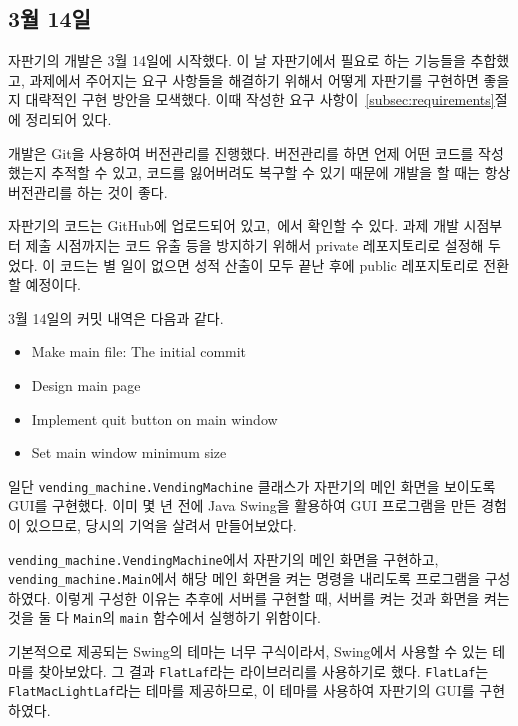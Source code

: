 \documentclass{oblivoir}
\begin{document}
    \subsection{3월 14일}\label{subsec:3-14}

    자판기의 개발은 3월 14일에 시작했다.
    이 날 자판기에서 필요로 하는 기능들을 추합했고,
    과제에서 주어지는 요구 사항들을 해결하기 위해서 어떻게 자판기를 구현하면 좋을지 대략적인 구현 방안을 모색했다.
    이때 작성한 요구 사항이~\ref{subsec:requirements}절에 정리되어 있다.

    개발은 Git을 사용하여 버전관리를 진행했다.
    버전관리를 하면 언제 어떤 코드를 작성했는지 추적할 수 있고, 코드를 잃어버려도 복구할 수 있기 때문에
    개발을 할 때는 항상 버전관리를 하는 것이 좋다.

    자판기의 코드는 GitHub에 업로드되어 있고,~\cite{github}에서 확인할 수 있다.
    과제 개발 시점부터 제출 시점까지는 코드 유출 등을 방지하기 위해서 private 레포지토리로 설정해 두었다.
    이 코드는 별 일이 없으면 성적 산출이 모두 끝난 후에 public 레포지토리로 전환할 예정이다.

    3월 14일의 커밋 내역은 다음과 같다.
    \begin{itemize}
        \item Make main file: The initial commit
        \item Design main page
        \item Implement quit button on main window
        \item Set main window minimum size
    \end{itemize}

    일단 \texttt{vending\_machine.VendingMachine} 클래스가 자판기의 메인 화면을 보이도록 GUI를 구현했다.
    이미 몇 년 전에 Java Swing을 활용하여 GUI 프로그램을 만든 경험이 있으므로,
    당시의 기억을 살려서 만들어보았다.

    \texttt{vending\_machine.VendingMachine}에서 자판기의 메인 화면을 구현하고,\\
    \texttt{vending\_machine.Main}에서 해당 메인 화면을 켜는 명령을 내리도록 프로그램을 구성하였다.
    이렇게 구성한 이유는 추후에 서버를 구현할 때,
    서버를 켜는 것과 화면을 켜는 것을 둘 다 \texttt{Main}의 \texttt{main} 함수에서 실행하기 위함이다.

    기본적으로 제공되는 Swing의 테마는 너무 구식이라서, Swing에서 사용할 수 있는 테마를 찾아보았다.
    그 결과 \texttt{FlatLaf}라는 라이브러리를 사용하기로 했다.
    \texttt{FlatLaf}는 \texttt{FlatMacLightLaf}라는 테마를 제공하므로,
    이 테마를 사용하여 자판기의 GUI를 구현하였다.
\end{document}
